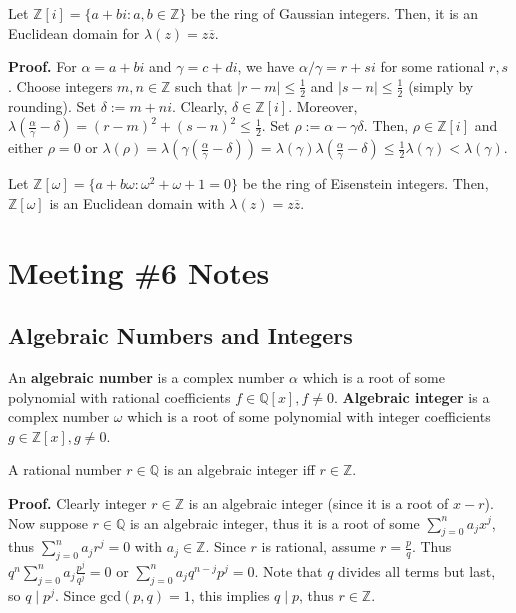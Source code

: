 \documentclass{template}
\begin{document}
\begin{theorem}
    Let $\mathbb{Z}[i] = \{a+bi: a,b \in \mathbb{Z}\}$ be the ring of Gaussian
    integers. Then, it is an Euclidean domain for $\lambda(z) = z\overline{z}$.
\end{theorem}

\textbf{Proof.} For $\alpha = a+bi$ and $\gamma=c+di$, we have $\alpha/\gamma =
r+si$ for some rational $r,s$. Choose integers $m,n \in \mathbb{Z}$ such that
$|r-m|\leq \frac{1}{2}$ and $|s-n| \leq \frac{1}{2}$ (simply by rounding). Set
$\delta := m+ni$. Clearly, $\delta \in \mathbb{Z}[i]$. Moreover,
$\lambda(\frac{\alpha}{\gamma} - \delta)=(r-m)^2+(s-n)^2 \leq \frac{1}{2}$. Set
$\rho := \alpha - \gamma\delta$. Then, $\rho \in \mathbb{Z}[i]$ and either
$\rho=0$ or $\lambda(\rho) =
\lambda(\gamma(\frac{\alpha}{\gamma}-\delta))=\lambda(\gamma)\lambda(\frac{\alpha}{\gamma}-\delta)
\leq \frac{1}{2}\lambda(\gamma)<\lambda(\gamma)$.

\begin{theorem}
    Let $\mathbb{Z}[\omega] = \{a+b\omega: \omega^2+\omega+1=0\}$ be the ring of
    Eisenstein integers. Then, $\mathbb{Z}[\omega]$ is an Euclidean domain with
    $\lambda(z) = z\overline{z}$.
\end{theorem}

\newpage
\section{Meeting \#6 Notes}

\subsection{Algebraic Numbers and Integers}

\begin{definition}
    An \textbf{algebraic number} is a complex number $\alpha$ which is a root of
    some polynomial with rational coefficients $f \in \mathbb{Q}[x], f \neq 0$.
    \textbf{Algebraic integer} is a complex number $\omega$ which is a root of
    some polynomial with integer coefficients $g \in \mathbb{Z}[x], g \neq 0$.
\end{definition}

\begin{proposition}
    A rational number $r \in \mathbb{Q}$ is an algebraic integer iff $r \in
    \mathbb{Z}$.
\end{proposition}

\textbf{Proof.} Clearly integer $r \in \mathbb{Z}$ is an algebraic integer
(since it is a root of $x-r$). Now suppose $r \in \mathbb{Q}$ is an algebraic
integer, thus it is a root of some $\sum_{j=0}^n a_jx^j$, thus $\sum_{j=0}^n
a_jr^j = 0$ with $a_j \in \mathbb{Z}$. Since $r$ is rational, assume
$r=\frac{p}{q}$. Thus $q^n\sum_{j=0}^n a_j\frac{p^j}{q^j} = 0$ or $\sum_{j=0}^n
a_jq^{n-j}p^j = 0$. Note that $q$ divides all terms but last, so $q \mid p^j$.
Since $\text{gcd}(p,q)=1$, this implies $q \mid p$, thus $r \in \mathbb{Z}$.
\end{document}
